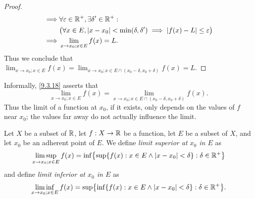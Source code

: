 \begin{proof}
\begin{align*}
    \implies & \forall \varepsilon \in \mathbb{R}^+, \exists \delta' \in \mathbb{R}^+ :                                                                              \\
             & \big(\forall x \in E, \left\lvert x - x_0\right\rvert < \min(\delta, \delta') \implies \left\lvert f(x) - L\right\rvert \leq \varepsilon\big)                             \\
    \implies & \lim_{x \to x_0 ; x \in E} f(x) = L.
  \end{align*}
  Thus we conclude that \(\lim_{x \to x_0 ; x \in E} f(x) = \lim_{x \to x_0 ; x \in E \cap (x_0 - \delta, x_0 + \delta)} f(x) = L\).
\end{proof}

\begin{note}
  Informally, \cref{9.3.18} asserts that
  \[
    \lim_{x \to x_0 ; x \in E} f(x) = \lim_{x \to x_0 ; x \in E \cap (x_0 - \delta, x_0 + \delta)} f(x).
  \]
  Thus the limit of a function at \(x_0\), if it exists, only depends on the values of \(f\) near \(x_0\);
  the values far away do not actually influence the limit.
\end{note}

\begin{ac}\label{ac:9.3.1}
  Let \(X\) be a subset of \(\mathbb{R}\), let \(f : X \to \mathbb{R}\) be a function, let \(E\) be a subset of \(X\), and let \(x_0\) be an adherent point of \(E\).
  We define \emph{limit superior at \(x_0\) in \(E\)} as
  \[
    \limsup_{x \to x_0 ; x \in E} f(x) = \inf\set{\sup\set{f(x) : x \in E \land \abs{x - x_0} < \delta} : \delta \in \R^+}
  \]
  and define \emph{limit inferior at \(x_0\) in \(E\)} as
  \[
    \liminf_{x \to x_0 ; x \in E} f(x) = \sup\set{\inf\set{f(x) : x \in E \land \abs{x - x_0} < \delta} : \delta \in \R^+}.
  \]
\end{ac}

